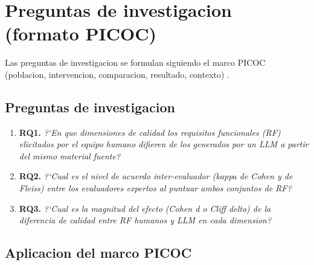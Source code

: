 \documentclass[12pt,a4paper]{article}
\begin{document}
\section{Preguntas de investigacion (formato PICOC)}

Las preguntas de investigacion se formulan siguiendo el marco PICOC
(poblacion, intervencion, comparacion, resultado, contexto)
\cite{kitchenham2007}.

\subsection{Preguntas de investigacion}

\begin{enumerate}
    \item \textbf{RQ1.} \emph{?`En que dimensiones de calidad los requisitos
    funcionales (RF) elicitados por el equipo humano difieren de los generados
    por un LLM a partir del mismo material fuente?}

    \item \textbf{RQ2.} \emph{?`Cual es el nivel de acuerdo inter-evaluador
    (kappa de Cohen y de Fleiss) entre los evaluadores expertos al puntuar
    ambos conjuntos de RF?}

    \item \textbf{RQ3.} \emph{?`Cual es la magnitud del efecto (Cohen d o
    Cliff delta) de la diferencia de calidad entre RF humanos y LLM en cada
    dimension?}
\end{enumerate}

\subsection{Aplicacion del marco PICOC}
\end{document}
